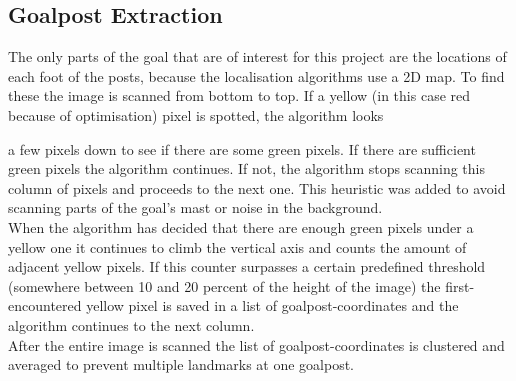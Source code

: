 \documentclass{ba-kecs}
\numberwithin{figure}{section}
\numberwithin{equation}{section}
\begin{document}
\subsection{Goalpost Extraction}
The only parts of the goal that are of interest for this project are the locations of each foot of the posts, because the localisation algorithms use a 2D map. To find these the image is scanned from bottom to top. If a yellow (in this case red because of optimisation) pixel is spotted, the algorithm looks {a few pixels down to see if there are some green pixels. If there are sufficient green pixels the algorithm continues. If not, the algorithm stops scanning this column of pixels and proceeds to the next one. This heuristic was added to avoid scanning parts of the goal's mast or noise in the background.\\
When the algorithm has decided that there are enough green pixels under a yellow one it continues to climb the vertical axis and counts the amount of adjacent yellow pixels. If this counter surpasses a certain predefined threshold (somewhere between 10 and 20 percent of the height of the image) the first-encountered yellow pixel is saved in a list of goalpost-coordinates and the algorithm continues to the next column.\\
After the entire image is scanned the list of goalpost-coordinates is clustered and averaged to prevent multiple landmarks at one goalpost.

}
\end{document}
